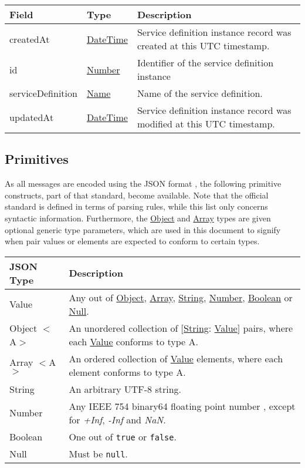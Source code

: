 \documentclass[a4paper]{arrowhead}
\newcommand{\pdef}[1]{{\textcolor{ArrowheadGrey}{#1 \label{sec:model:primitives:#1} \label{sec:model:primitives:#1s}}}}
\newcommand{\pref}[1]{{\textcolor{ArrowheadGrey}{\hyperref[sec:model:primitives:#1]{#1}}}}
\begin{document}
\begin{table}[ht!]
\begin{tabularx}{\textwidth}{| p{4.25cm} | p{3.5cm} | X |} \hline
\rowcolor{gray!33} Field & Type      & Description \\ \hline
createdAt & \pref{DateTime} & Service definition instance record was created at this UTC timestamp. \\ \hline
id & \pref{Number} & Identifier of the service definition instance \\ \hline
serviceDefinition &\pref{Name}  & Name of the service definition. \\ \hline
updatedAt & \pref{DateTime} & Service definition instance record was modified at this UTC timestamp. \\ \hline
\end{tabularx}
\end{table}

\newpage

\subsection{Primitives}
\label{sec:model:primitives}

As all messages are encoded using the JSON format \cite{bray2014json}, the following primitive constructs, part of that standard, become available.
Note that the official standard is defined in terms of parsing rules, while this list only concerns syntactic information.
Furthermore, the \pref{Object} and \pref{Array} types are given optional generic type parameters, which are used in this document to signify when pair values or elements are expected to conform to certain types. 

\begin{table}[ht!]
\begin{tabularx}{\textwidth}{| p{3cm} | X |} \hline
\rowcolor{gray!33} JSON Type & Description \\ \hline
\pdef{Value}                 & Any out of \pref{Object}, \pref{Array}, \pref{String}, \pref{Number}, \pref{Boolean} or \pref{Null}. \\ \hline
\pdef{Object}$<$A$>$         & An unordered collection of $[$\pref{String}: \pref{Value}$]$ pairs, where each \pref{Value} conforms to type A. \\ \hline
\pdef{Array}$<$A$>$          & An ordered collection of \pref{Value} elements, where each element conforms to type A. \\ \hline
\pdef{String}                & An arbitrary UTF-8 string. \\ \hline
\pdef{Number}                & Any IEEE 754 binary64 floating point number \cite{cowlishaw2019floating}, except for \textit{+Inf}, \textit{-Inf} and \textit{NaN}. \\ \hline
\pdef{Boolean}               & One out of \texttt{true} or \texttt{false}. \\ \hline
\pdef{Null}                  & Must be \texttt{null}. \\ \hline
\end{tabularx}
\end{table}
\end{document}

